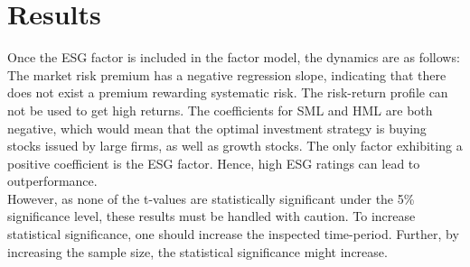 \documentclass[12pt, a4paper]{article}%
\begin{document}

\section{Results} 

Once the ESG factor is included in the factor model, the dynamics are as follows: The market risk premium has a negative regression slope, indicating that there does not exist a premium rewarding systematic risk. The risk-return profile can not be used to get high returns.
The coefficients for SML and HML are both negative, which would mean that the optimal investment strategy is buying stocks issued by large firms, as well as growth stocks.
The only factor exhibiting a positive coefficient is the ESG factor. Hence, high ESG ratings can lead to outperformance.\\
However, as none of the t-values are statistically significant under the 5\% significance level, these results must be handled with caution.
To increase statistical significance, one should increase the inspected time-period. Further, by increasing the sample size, the statistical significance might increase.
\end{document}
